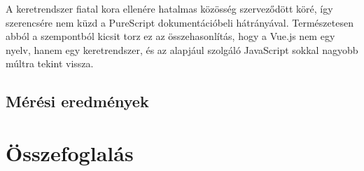 \documentclass[12pt]{article}
\newtheorem{definíció}[theorem]{Definíció}
\begin{document}
A keretrendszer fiatal kora ellenére hatalmas közösség szerveződött köré, így szerencsére nem küzd a PureScript dokumentációbeli hátrányával. Természetesen abból a szempontból kicsit torz ez az összehasonlítás, hogy a Vue.js nem egy nyelv, hanem egy keretrendszer, és az alapjául szolgáló JavaScript sokkal nagyobb múltra tekint vissza.

\subsection{Mérési eredmények}

\newpage
\section*{Összefoglalás}





\end{document}
